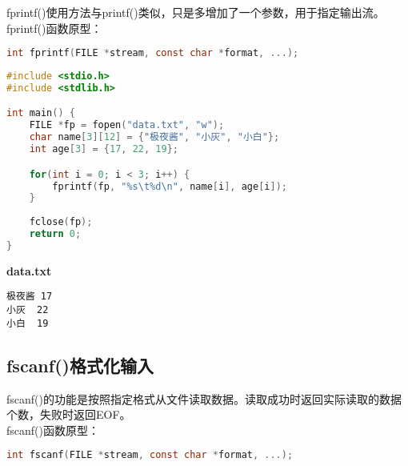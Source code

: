 fprintf()使用方法与printf()类似，只是多增加了一个参数，用于指定输出流。\\

fprintf()函数原型：

\vspace{-0.5cm}

\begin{lstlisting}[language=C]
int fprintf(FILE *stream, const char *format, ...);
\end{lstlisting}

\vspace{0.5cm}


\begin{lstlisting}[language=C, title=fprintf.c]
#include <stdio.h>
#include <stdlib.h>

int main() {
    FILE *fp = fopen("data.txt", "w");
    char name[3][12] = {"极夜酱", "小灰", "小白"};
    int age[3] = {17, 22, 19};

    for(int i = 0; i < 3; i++) {
        fprintf(fp, "%s\t%d\n", name[i], age[i]);
    }
    
    fclose(fp);
    return 0;
}
\end{lstlisting}

\begin{tcolorbox}
    \textbf{data.txt}
    \begin{verbatim}
极夜酱	17
小灰	22
小白	19
	\end{verbatim}
\end{tcolorbox}

\vspace{0.5cm}

\subsection{fscanf()格式化输入}

fscanf()的功能是按照指定格式从文件读取数据。读取成功时返回实际读取的数据个数，失败时返回EOF。\\

fscanf()函数原型：

\vspace{-0.5cm}

\begin{lstlisting}[language=C]
int fscanf(FILE *stream, const char *format, ...);
\end{lstlisting}

\vspace{0.5cm}

